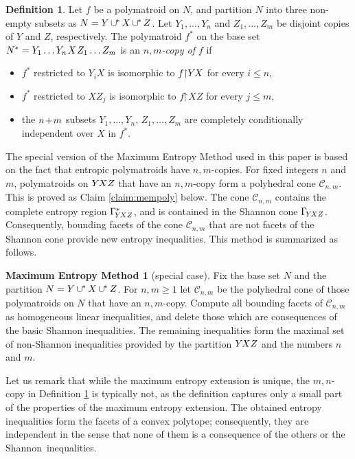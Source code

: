 \documentclass[reqno]{amsart}
\theoremstyle{definition}
\newtheorem{definition}{Definition}
\newtheorem*{method}{Maximum Entropy Method}
\newcommand\tsp{\mkern 1.5mu}
\def\restr{\mathord\upharpoonright}
\renewcommand\ge{\geqslant}\renewcommand\le{\leqslant}
\newcommand\C{\mathcal C}
\newcommand\cups{\mathrel{\cup\mkern -1mu^*\mkern-3mu}}
\renewcommand\cups{\mathop{{\cup}\mkern -2mu ^*}}
\def\m#1{\tsp{#1}\tsp}
\def\G#1{\Gamma_{\!#1}}
\def\Ga#1{\Gamma^*_{\!#1}}
\def\YXZ{Y\mkern-2mu XZ}
\def\YX{Y\mkern-2mu X}
\begin{document}
\begin{definition}\label{def:maxent1}
Let $f$ be a polymatroid on $N$, and partition $N$ into three non-empty
subsets as $N=Y\cups X\cups Z$. Let $Y_1,\dots,Y_n$ and $Z_1,\dots,Z_m$
be disjoint copies of $Y$ and $Z$, respectively. The polymatroid $f^*$
on the base set $N^*=Y_1\dots Y_n\tsp X \tsp Z_1\dots Z_m$ is an
\emph{$n,m$-copy of $f$} if
\begin{itemize}
\item[(i)]
   $f^*$ restricted to $Y_iX$ is isomorphic to $f\restr \YX$ for
   every $i\le n$,
\item[(ii)]
   $f^*$ restricted to $XZ_j$ is isomorphic to 
   $f\restr XZ$ for every $j\le m$,
\item[(iii)]
   the $n\m+m$ subsets $Y_1, \dots, Y_n,\, Z_1, \dots, Z_m$ are completely
   conditionally independent over $X$ in $f^*$.
\end{itemize}
\end{definition}
The special version of the Maximum Entropy Method used in this paper is
based on the fact that entropic polymatroids have $n,m$-copies. For fixed
integers $n$ and $m$, polymatroids on $\YXZ$ that have an $n,m$-copy form a
polyhedral cone $\C_{n,m}$. This is proved as Claim \ref{claim:mempoly}
below. The cone $\C_{n,m}$ contains the complete entropy region $\Ga{\YXZ}$,
and is contained in the Shannon cone $\G{\YXZ}$. Consequently, bounding
facets of the cone $\C_{n,m}$ that are not facets of the Shannon cone
provide new entropy inequalities. This method is summarized as follows.

\begin{method}[special case]
Fix the base set $N$ and the partition $N=Y\cups X\cups Z$. For $n,m \ge 1$
let $\C_{n,m}$ be the polyhedral cone of those polymatroids on $N$ that have
an $n,m$-copy. Compute all bounding facets of $\C_{n,m}$ as homogeneous
linear inequalities, and delete those which are consequences of the basic
Shannon inequalities. The remaining inequalities form the maximal set of
non-Shannon inequalities provided by the partition $\YXZ$ and the numbers
$n$ and $m$.
\end{method}

Let us remark that while the maximum entropy extension is unique, the
$m,n$-copy in Definition \ref{def:maxent1} is typically not, as the
definition captures only a small part of the properties of the maximum
entropy extension. The obtained entropy inequalities form the facets of a
convex polytope; consequently, they are independent in the sense that none
of them is a consequence of the others or the Shannon~inequalities.
\end{document}
